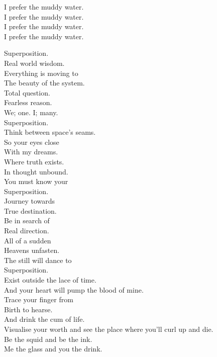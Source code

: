 I prefer the muddy water. \\
I prefer the muddy water. \\
I prefer the muddy water. \\
I prefer the muddy water. \\




Superposition. \\
Real world wisdom. \\
Everything is moving to \\
The beauty of the system. \\

Total question. \\
Fearless reason. \\
We; one. I; many. \\
Superposition. \\

Think between space's seams. \\
So your eyes close \\
With my dreams. \\
Where truth exists. \\
In thought unbound. \\
You must know your \\
Superposition. \\

Journey towards \\
True destination. \\
Be in search of \\
Real direction. \\

All of a sudden \\
Heavens unfasten. \\
The still will dance to \\
Superposition. \\

Exist outside the lace of time. \\
And your heart will pump the blood of mine. \\
Trace your finger from \\
Birth to hearse. \\
And drink the cum of life. \\
Visualise your worth and see the place where you'll curl up and die. \\
Be the squid and be the ink. \\
Me the glass and you the drink. \\

